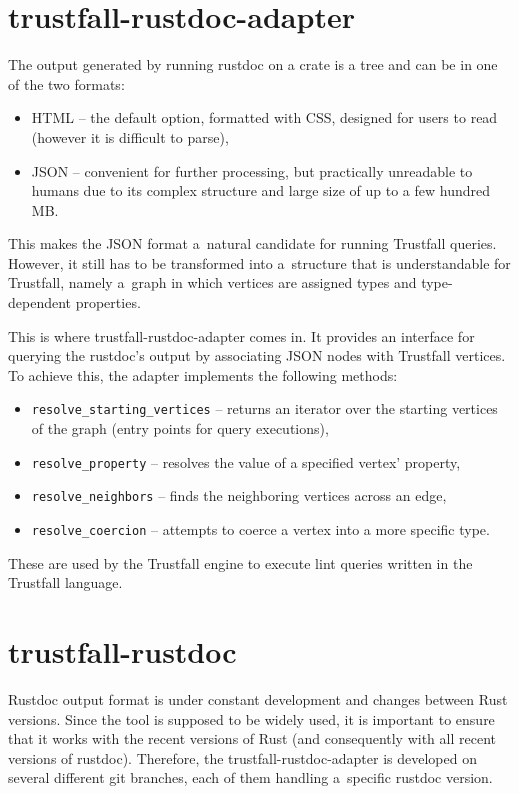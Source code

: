 \documentclass[licencjacka,en]{pracamgr}
\begin{document}
\section{trustfall-rustdoc-adapter}
The output generated by running rustdoc on a crate is a tree and can be in one of the two formats:
\begin{itemize}
	\item HTML -- the default option, formatted with CSS, designed for users to read (however it is
		difficult to parse),
	\item JSON -- convenient for further processing, but practically unreadable to humans due to its
		complex structure and large size of up to a few hundred MB.
\end{itemize}
This makes the JSON format a~natural candidate for running Trustfall queries. However, it still has
to be transformed into a~structure that is understandable for Trustfall, namely a~graph in which
vertices are assigned types and type-dependent properties.

This is where trustfall-rustdoc-adapter comes in. It provides an interface for querying
the rustdoc's output by associating JSON nodes with Trustfall vertices. To achieve this, the adapter
implements the following methods:
\begin{itemize}
	\item \texttt{resolve\_starting\_vertices} -- returns an iterator over the starting vertices of
		the graph (entry points for query executions),
	\item \texttt{resolve\_property} -- resolves the value of a specified vertex' property,
	\item \texttt{resolve\_neighbors} -- finds the neighboring vertices across an edge,
	\item \texttt{resolve\_coercion} -- attempts to coerce a vertex into a more specific type.
\end{itemize}
These are used by the Trustfall engine to execute lint queries written in the Trustfall language.

\section{trustfall-rustdoc}

Rustdoc output format is under constant development and changes between Rust versions.
Since the tool is supposed to be widely used, it is important to ensure that it works with
the recent versions of Rust (and consequently with all recent versions of rustdoc).
Therefore, the trustfall-rustdoc-adapter is developed on several different git branches,
each of them handling a~specific rustdoc version.
\end{document}
